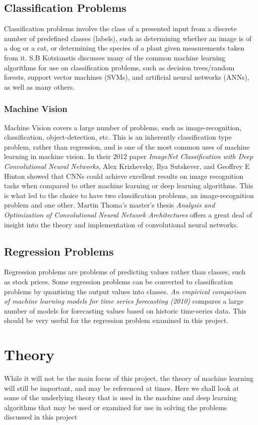 \documentclass[12pt,a4paper,titlepage]{book}
\begin{document}
\section{Classification Problems}
	Classification problems involve the class of a presented input from a discrete number of predefined classes (labels), such as determining whether an image is of a dog or a cat, or determining the species of a plant given measurements taken from it. S.B Kotsianstis\cite{classification-techniques} discusses many of the common machine learning algorithms for use on classification problems, such as decision trees/random forests, support vector machines (SVMs), and artificial neural networks (ANNs), as well as many others.
\subsection{Machine Vision}
	Machine Vision covers a large number of problems, such as image-recognition, classification, object-detection, etc. This is an inherently classification type problem, rather than regression, and is one of the most common uses of machine learning in machine vision. In their 2012 paper \textit{ImageNet Classification with Deep Convolutional Neural Networks}\cite{image-net}, Alex Krizhevsky, Ilya Sutskever, and Geoffrey E Hinton showed that CNNs could achieve excellent results on image recognition tasks when compared to other machine learning or deep learning algorithms. This is what led to the choice to have two classification problems, an image-recognition problem and one other. Martin Thoma's master's thesis \textit{Analysis and Optimization of Convolutional Neural Network Architectures}\cite{cnn-analysis} offers a great deal of insight into the theory and implementation of convolutional neural networks.
\section{Regression Problems}
	Regression problems are problems of predicting values rather than classes, such as stock prices. Some regression problems can be converted to classification problems by quantising the output values into classes. \textit{An empirical comparison of machine learning models for time series forecasting (2010)}\cite{regression-techniques} compares a large number of models for forecasting values based on historic time-series data. This should be very useful for the regression problem examined in this project.

\chapter{Theory}
	While it will not be the main focus of this project, the theory of machine learning will still be important, and may be referenced at times. Here we shall look at some of the underlying theory that is used in the machine and deep learning algorithms that may be used or examined for use in solving the problems discussed in this project
\end{document}
